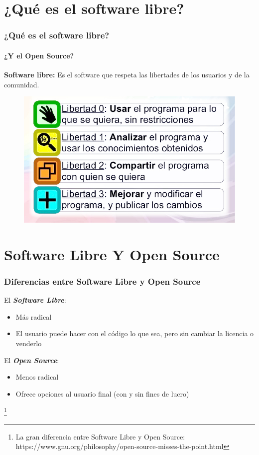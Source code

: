 \documentclass{beamer}
\begin{document}
    \section{¿Qué es el software libre?}
    \begin{frame}
     \frametitle{¿Qué es el software libre?}
     \framesubtitle{¿Y el Open Source?}
     \textbf{Software libre:} Es el software que respeta las libertades de los usuarios y de la 
     comunidad.
     \begin{figure}[b]
     \includegraphics[scale=1]{libertades(1).jpg}
      \centering
     \end{figure}
     
     
    \end{frame}
    \section{Software Libre Y Open Source}
    \begin{frame}
        \frametitle{Diferencias entre Software Libre y Open Source}
      
        
        El \textbf{\textit{Software Libre}}: 
        \begin{itemize}
            \item Más radical
            \item El usuario puede hacer con el código lo que sea, pero sin 
            cambiar la licencia o venderlo
        \end{itemize}
        
        El \textbf{\textit{Open Source}}:
        \begin{itemize}
         \item Menos radical
         \item Ofrece opciones al usuario final (con y sin fines de lucro)
        \end{itemize}
        \footnote{La gran diferencia entre Software Libre y Open Source: https://www.gnu.org/philosophy/open-source-misses-the-point.html}
    \end{frame}
\end{document}
